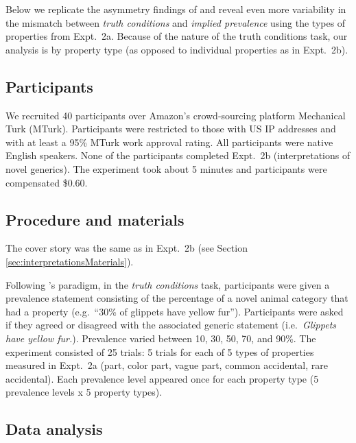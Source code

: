 \documentclass[10pt,letterpaper]{article}
\begin{document}
Below we replicate the asymmetry findings of  and reveal even more variability in the mismatch between \emph{truth conditions} and \emph{implied prevalence} using the types of properties from Expt.~2a.
Because of the nature of the truth conditions task, our analysis is by property type (as opposed to individual properties as in Expt.~2b).


\subsection{Participants}

We recruited 40 participants over Amazon's crowd-sourcing platform Mechanical Turk (MTurk).  
Participants were restricted to those with US IP addresses and with at least a 95\% MTurk work approval rating. 
All participants were native English speakers. 
None of the participants completed Expt.~2b (interpretations of novel generics).
The experiment took about 5 minutes and participants were compensated \$0.60.

\subsection{Procedure and materials}

The cover story was the same as in Expt.~2b (see Section \ref{sec:interpretationsMaterials}).

Following \citeauthor{Cimpian2010}'s paradigm, in the \emph{truth conditions} task, participants were given a prevalence statement consisting of the percentage of a novel animal category that had a property (e.g.~``30\% of glippets have yellow fur''). 
Participants were asked if they agreed or disagreed with the associated generic statement (i.e.~\emph{Glippets have yellow fur.}).
Prevalence varied between 10, 30, 50, 70, and 90\%.
The experiment consisted of 25 trials: 5 trials for each of 5 types of properties measured in Expt.~2a (part, color part, vague part, common accidental, rare accidental). 
Each prevalence level appeared once for each property type (5 prevalence levels x 5 property types). 

\subsection{Data analysis}
\end{document}

